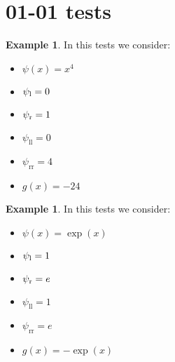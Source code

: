 \documentclass[11pt,a4paper]{article}
\author{}
\title{}
\theoremstyle{plain}
\theoremstyle{definition}
\newtheorem{exmp}[thm]{Example} %
\begin{document}
\tableofcontents
\listoftables

\dotfill
\section{01-01 tests}
\begin{exmp}
\label{Example:PRO:bending:01_01_glob3}
In this tests we consider:
\begin{itemize}
\item $\psi(x)=x^4$
\item $\psi_\text l=0$
\item $\psi_\text r=1$
\item $\psi_\text{ll}=0$
\item $\psi_\text{rr}=4$
\item $g(x)=-24$
\end{itemize}
\end{exmp}

%
%
%
%

\pagebreak

\begin{exmp}
\label{Example:PRO:bending:01_01_glob1}
In this tests we consider:
\begin{itemize}
\item $\psi(x)=\exp(x)$
\item $\psi_\text l=1$
\item $\psi_\text r=e$
\item $\psi_\text{ll}=1$
\item $\psi_\text{rr}=e$
\item $g(x)=-\exp(x)$
\end{itemize}
\end{exmp}


%
%
%
%
\pagebreak 

%
\end{document}
